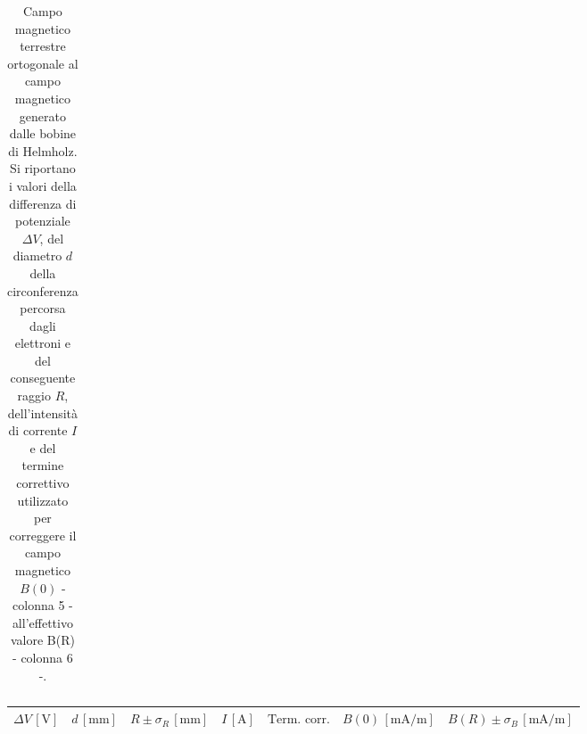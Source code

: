 \documentclass[]{article}
\begin{document}
\begin{table}[H]
\begin{tabular}{||c|c|c|c|c|c|c|c|c||}
    \end{tabular}
    \caption{Campo magnetico terrestre ortogonale al campo magnetico generato dalle bobine di Helmholz. Si riportano i valori della differenza di potenziale $\Delta V$, del diametro $ d $ della circonferenza percorsa dagli elettroni e del conseguente raggio $ R $, dell'intensità di corrente $ I $ e del termine correttivo utilizzato per correggere il campo magnetico $B(0)$ - colonna 5 - all'effettivo valore B(R) - colonna 6 -.}
    \label{CM_ortogonale}
\end{table}


\begin{table}
    \centering

\begin{tabular}{||c|c|c|c|c|c|c||}
    \hline
    $\Delta V\, [\text{V}] $ & $d\, [\text{mm}] $ & $R \pm \sigma_R\, [\text{mm}] $ & $I\, [\text{A}] $ & $\text{Term. corr.}$ & $B(0)\, [\text{mA/m}] $ & $B(R) \pm \sigma_B\, [\text{mA/m}] $ \\
    \hline\hline


\end{tabular}
\end{table}
\end{document}
